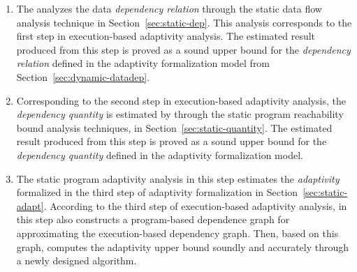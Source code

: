 \begin{enumerate}
\item The {\THESYSTEM} analyzes the data \emph{dependency relation} through the static data flow analysis technique in Section~\ref{sec:static-dep}.
This analysis corresponds to the first step in execution-based adaptivity analysis. 
The estimated result produced from 
this step is proved as a sound upper bound for the \emph{dependency relation} defined in the adaptivity formalization model from Section~\ref{sec:dynamic-datadep}.
\item 
Corresponding to the second step in execution-based adaptivity analysis, the \emph{dependency quantity} 
is estimated by {\THESYSTEM} through the static program reachability bound analysis techniques, in Section~\ref{sec:static-quantity}.
The estimated result produced from 
this step is proved as a sound upper bound for the \emph{dependency quantity} defined in the adaptivity formalization model.
\item 
The static program adaptivity analysis in this step
estimates the \emph{adaptivity} formalized in the third step of adaptivity formalization in Section~\ref{sec:static-adapt}.
According to the third step of execution-based adaptivity analysis, 
{\THESYSTEM} in this step also constructs a program-based dependence graph for approximating the execution-based dependency graph.
Then, based on this graph, {\THESYSTEM} 
computes the adaptivity upper bound soundly 
and accurately through a newly designed algorithm.
\end{enumerate}


